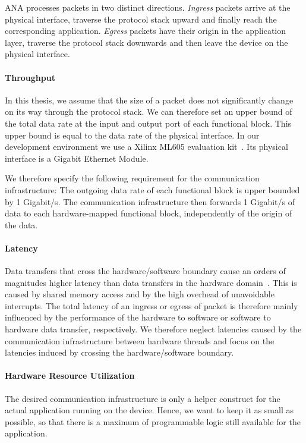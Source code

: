 ANA processes packets in two distinct directions. \textit{Ingress} packets arrive at the physical interface, traverse the protocol stack upward and finally reach the corresponding application. \textit{Egress} packets have their origin in the application layer, traverse the protocol stack downwards and then leave the device on the physical interface.

\paragraph{Throughput}
In this thesis, we assume that the size of a packet does not significantly change on its way through the protocol stack. We can therefore set an upper bound of the total data rate at the input and output port of each functional block. This upper bound is equal to the data rate of the physical interface. In our development environment we use a Xilinx ML605 evaluation kit~\cite{ml605}. Its physical interface is a Gigabit Ethernet Module.

We therefore specify the following requirement for the communication infrastructure: The outgoing data rate of each functional block is upper bounded by 1 Gigabit/s. The communication infrastructure then forwards 1 Gigabit/s of data to each hardware-mapped functional block, independently of the origin of the data.

\paragraph{Latency}
Data transfers that cross the hardware/software boundary cause an orders of magnitudes higher latency than data transfers in the hardware domain~\cite{reconfigurableNodesForFutureNetworks}. This is caused by shared memory access and by the high overhead of unavoidable interrupts. The total latency of an ingress or egress of packet is therefore mainly influenced by the performance of the hardware to software or software to hardware data transfer, respectively. We therefore neglect latencies caused by the communication infrastructure between hardware threads and focus on the latencies induced by crossing the hardware/software boundary.

\paragraph{Hardware Resource Utilization}
The desired communication infrastructure is only a helper construct for the actual application running on the device. Hence, we want to keep it as small as possible, so that there is a maximum of programmable logic still available for the application.

